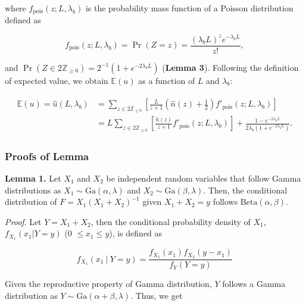 \documentclass[11pt, class=article, crop=false]{standalone}
\begin{document}
where $f_{\text{pois}}(z; L, \lambda_b)$ is the probability mass function of a Poisson distribution defined as

\begin{equation}
    f_{\text{pois}}(z; L, \lambda_b) = \Pr(Z = z) = \frac{(\lambda_b L)^{z} e^{-\lambda_b L}}{z!},
\end{equation}

and $\Pr(Z \in 2\mathbb{Z}_{\ge 0}) = 2^{-1}(1 + e^{- 2 \lambda_b L})$ (\textbf{Lemma 3}). 
Following the definition of expected value, we obtain $\mathbb{E}(u)$ as a function of $L$ and $\lambda_b$:

\begin{align}
    \begin{split}
        \mathbb{E}(u) = \hat{u}(L, \lambda_b) 
                    &= \sum_{z \in 2\mathbb{Z}_{\ge 0}} \left[ \frac{L}{z + 1} \left(\hat{n}(z) + \frac{1}{2}\right) f'_{\text{pois}}(z; L, \lambda_b) \right]\\
                    &= L \sum_{z \in 2\mathbb{Z}_{\ge 0}} \left[ \frac{\hat{n}(z)}{z + 1} f'_{\text{pois}}(z; L, \lambda_b)\right] + 
                    \frac{1 - e^{-2 \lambda_b L}}{2 \lambda_b (1 + e^{-2 \lambda_b L})}.
    \end{split}
\end{align}

\subsubsection{Proofs of Lemma}

\textbf{Lemma 1.}
Let $X_1$ and $X_2$ be independent random variables that follow Gamma distributions as $X_1 \sim \mbox{Ga}(\alpha, \lambda)$ and $X_2 \sim \mbox{Ga}(\beta, \lambda)$.
Then, the conditional distribution of $F = X_1(X_1 + X_2)^{-1}$ given $X_1 + X_2 = y$ follows $\mbox{Beta}(\alpha, \beta)$.

\textit{Proof}.
Let $Y = X_1 + X_2$, then the conditional probability density of $X_1$, $f_{X_1}(x_1 | Y = y)$ (0 $\le x_1 \le y$), is defined as

\begin{equation}
    f_{X_1}(x_1~|~Y = y) = \frac{f_{X_1}(x_1) f_{X_2}(y - x_1)}{f_{Y}(Y = y)}
\end{equation}

Given the reproductive property of Gamma distribution, $Y$ follows a Gamma distribution as $Y \sim \mbox{Ga}(\alpha + \beta, \lambda)$.
Thus, we get
\end{document}
